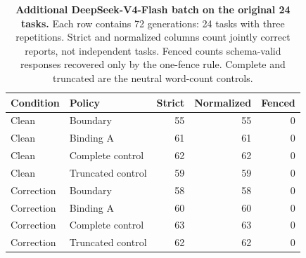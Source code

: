 \begin{table}[H]
\centering\small
\caption{\textbf{Additional DeepSeek-V4-Flash batch on the original 24 tasks.} Each row contains 72 generations: 24 tasks with three repetitions. Strict and normalized columns count jointly correct reports, not independent tasks. Fenced counts schema-valid responses recovered only by the one-fence rule. Complete and truncated are the neutral word-count controls.}
\label{tab:additive-counts}
\begin{tabular}{llrrr}\toprule
Condition & Policy & Strict & Normalized & Fenced\\\midrule
Clean & Boundary & 55 & 55 & 0\\
Clean & Binding A & 61 & 61 & 0\\
Clean & Complete control & 62 & 62 & 0\\
Clean & Truncated control & 59 & 59 & 0\\
Correction & Boundary & 58 & 58 & 0\\
Correction & Binding A & 60 & 60 & 0\\
Correction & Complete control & 63 & 63 & 0\\
Correction & Truncated control & 62 & 62 & 0\\
\bottomrule\end{tabular}
\end{table}
